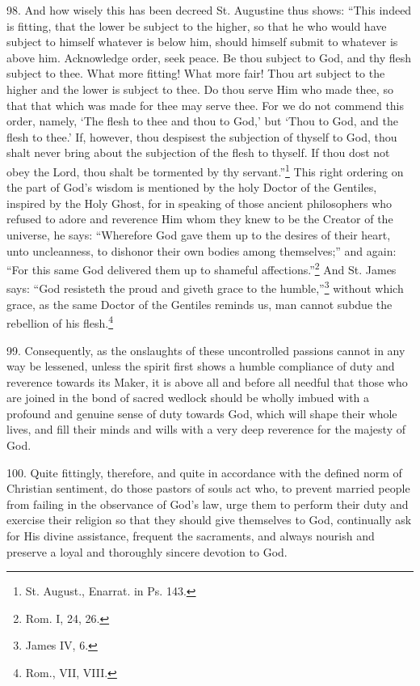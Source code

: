 \documentclass[12pt,a4paper]{book}
\begin{document}
98. And how wisely this has been decreed St. Augustine thus shows: ``This indeed is fitting, that the lower be subject to the higher, so that he who would have subject to himself whatever is below him, should himself submit to whatever is above him. Acknowledge order, seek peace. Be thou subject to God, and thy flesh subject to thee. What more fitting! What more fair! Thou art subject to the higher and the lower is subject to thee. Do thou serve Him who made thee, so that that which was made for thee may serve thee. For we do not commend this order, namely, `The flesh to thee and thou to God,' but `Thou to God, and the flesh to thee.' If, however, thou despisest the subjection of thyself to God, thou shalt never bring about the subjection of the flesh to thyself. If thou dost not obey the Lord, thou shalt be tormented by thy servant.''\footnote{St. August., Enarrat. in Ps. 143.} This right ordering on the part of God's wisdom is mentioned by the holy Doctor of the Gentiles, inspired by the Holy Ghost, for in speaking of those ancient philosophers who refused to adore and reverence Him whom they knew to be the Creator of the universe, he says: ``Wherefore God gave them up to the desires of their heart, unto uncleanness, to dishonor their own bodies among themselves;'' and again: ``For this same God delivered them up to shameful affections.''\footnote{Rom. I, 24, 26.} And St. James says: ``God resisteth the proud and giveth grace to the humble,''\footnote{James IV, 6.} without which grace, as the same Doctor of the Gentiles reminds us, man cannot subdue the rebellion of his flesh.\footnote{Rom., VII, VIII.}

99. Consequently, as the onslaughts of these uncontrolled passions cannot in any way be lessened, unless the spirit first shows a humble compliance of duty and reverence towards its Maker, it is above all and before all needful that those who are joined in the bond of sacred wedlock should be wholly imbued with a profound and genuine sense of duty towards God, which will shape their whole lives, and fill their minds and wills with a very deep reverence for the majesty of God.

100. Quite fittingly, therefore, and quite in accordance with the defined norm of Christian sentiment, do those pastors of souls act who, to prevent married people from failing in the observance of God's law, urge them to perform their duty and exercise their religion so that they should give themselves to God, continually ask for His divine assistance, frequent the sacraments, and always nourish and preserve a loyal and thoroughly sincere devotion to God.
\end{document}
